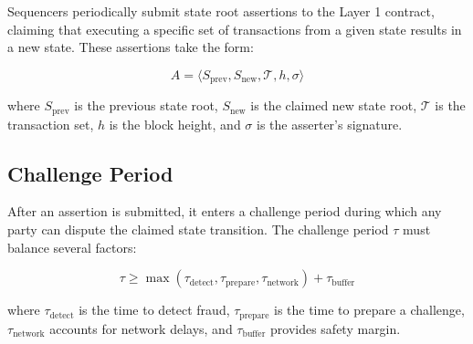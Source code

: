 Sequencers periodically submit state root assertions to the Layer 1 contract, claiming that executing a specific set of transactions from a given state results in a new state. These assertions take the form:

\begin{equation}
A = \langle S_{\text{prev}}, S_{\text{new}}, \mathcal{T}, h, \sigma \rangle
\end{equation}

where $S_{\text{prev}}$ is the previous state root, $S_{\text{new}}$ is the claimed new state root, $\mathcal{T}$ is the transaction set, $h$ is the block height, and $\sigma$ is the asserter's signature.

\subsection{Challenge Period}

After an assertion is submitted, it enters a challenge period during which any party can dispute the claimed state transition. The challenge period $\tau$ must balance several factors:

\begin{equation}
\tau \geq \max(\tau_{\text{detect}}, \tau_{\text{prepare}}, \tau_{\text{network}}) + \tau_{\text{buffer}}
\end{equation}

where $\tau_{\text{detect}}$ is the time to detect fraud, $\tau_{\text{prepare}}$ is the time to prepare a challenge, $\tau_{\text{network}}$ accounts for network delays, and $\tau_{\text{buffer}}$ provides safety margin.

